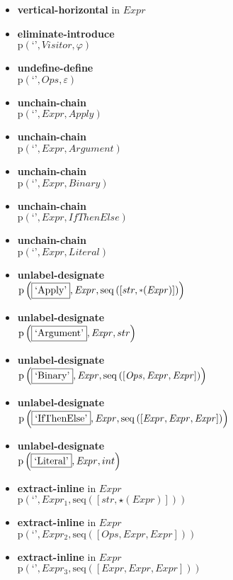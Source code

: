 {\begin{itemize}
\item \textbf{vertical-horizontal}  in $\mathit{Expr}$
\item \textbf{eliminate-introduce}\\$\mathrm{p}\left(\text{`'},\mathit{Visitor},\varphi\right)$
\item \textbf{undefine-define}\\$\mathrm{p}\left(\text{`'},\mathit{Ops},\varepsilon\right)$
\item \textbf{unchain-chain}\\$\mathrm{p}\left(\text{`'},\mathit{Expr},\mathit{Apply}\right)$
\item \textbf{unchain-chain}\\$\mathrm{p}\left(\text{`'},\mathit{Expr},\mathit{Argument}\right)$
\item \textbf{unchain-chain}\\$\mathrm{p}\left(\text{`'},\mathit{Expr},\mathit{Binary}\right)$
\item \textbf{unchain-chain}\\$\mathrm{p}\left(\text{`'},\mathit{Expr},\mathit{IfThenElse}\right)$
\item \textbf{unchain-chain}\\$\mathrm{p}\left(\text{`'},\mathit{Expr},\mathit{Literal}\right)$
\item \textbf{unlabel-designate}\\$\mathrm{p}\left(\fbox{\text{`Apply'}},\mathit{Expr},\mathrm{seq}\left(\left[str, \star \left(\mathit{Expr}\right)\right]\right)\right)$
\item \textbf{unlabel-designate}\\$\mathrm{p}\left(\fbox{\text{`Argument'}},\mathit{Expr},str\right)$
\item \textbf{unlabel-designate}\\$\mathrm{p}\left(\fbox{\text{`Binary'}},\mathit{Expr},\mathrm{seq}\left(\left[\mathit{Ops}, \mathit{Expr}, \mathit{Expr}\right]\right)\right)$
\item \textbf{unlabel-designate}\\$\mathrm{p}\left(\fbox{\text{`IfThenElse'}},\mathit{Expr},\mathrm{seq}\left(\left[\mathit{Expr}, \mathit{Expr}, \mathit{Expr}\right]\right)\right)$
\item \textbf{unlabel-designate}\\$\mathrm{p}\left(\fbox{\text{`Literal'}},\mathit{Expr},int\right)$
\item \textbf{extract-inline}  in $\mathit{Expr}$\\$\mathrm{p}\left(\text{`'},\mathit{Expr_1},\mathrm{seq}\left(\left[str, \star \left(\mathit{Expr}\right)\right]\right)\right)$
\item \textbf{extract-inline}  in $\mathit{Expr}$\\$\mathrm{p}\left(\text{`'},\mathit{Expr_2},\mathrm{seq}\left(\left[\mathit{Ops}, \mathit{Expr}, \mathit{Expr}\right]\right)\right)$
\item \textbf{extract-inline}  in $\mathit{Expr}$\\$\mathrm{p}\left(\text{`'},\mathit{Expr_3},\mathrm{seq}\left(\left[\mathit{Expr}, \mathit{Expr}, \mathit{Expr}\right]\right)\right)$
\end{itemize}}


